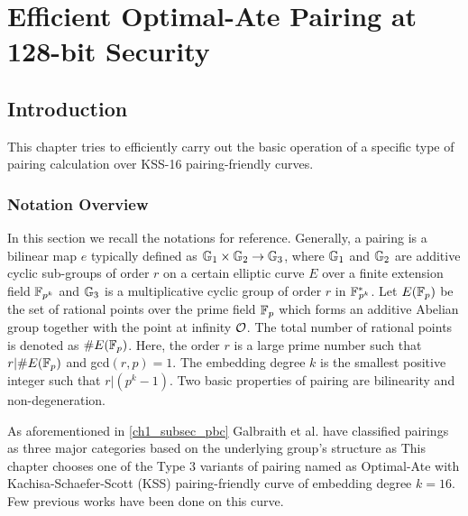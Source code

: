 \chapter{Efficient Optimal-Ate Pairing at 128-bit Security} 
\label{ch:indocrypt}
\section{Introduction}
This chapter tries to efficiently carry out the basic operation of a specific type of pairing calculation over KSS-16 pairing-friendly curves. 

\subsection{Notation Overview}
In this section we recall the notations for reference.
Generally, a pairing is a bilinear map $e$ typically defined as  ${\mathbb{G}}_{1} \times {\mathbb{G}}_{2} \to {\mathbb{G}}_{3}$, where ${\mathbb{G}}_{1}$ and ${\mathbb{G}}_{2}$ are additive cyclic sub-groups of  order $r$  on a certain elliptic curve $E$ over a finite extension field $\mathbb{F}_{p^k}$ and ${\mathbb{G}}_{3}$ is a multiplicative cyclic group of order $r$ in ${{\mathbb{F}}^{\ast}}_{\!\!\!p^{k}}$.
Let $E({\mathbb{F}}_{p})$ be the set of rational points over the prime field ${\mathbb{F}}_{p}$ which forms an additive Abelian group together with the point at infinity $\cal{O}$. The total number of rational points is denoted as $\#E({\mathbb{F}}_{p})$. Here, the order $r$ is a large prime number such that $r | \#E({\mathbb{F}}_{p})$ and gcd$(r,p)=1$. The embedding degree $k$ is the smallest positive integer such that $r | (p^k -1)$.
 Two basic properties of pairing are bilinearity and non-degeneration.


As aforementioned in \ref{ch1_subsec_pbc} Galbraith et al. \cite{galbraith2008pairings} have classified pairings as three major categories based on the underlying group's structure as 
This chapter chooses one of the Type 3 variants of pairing named as Optimal-Ate \cite{DBLP:journals/tit/Vercauteren10} with Kachisa-Schaefer-Scott (KSS) \cite{EPRINT:KacSchSco07} pairing-friendly curve of embedding degree $k=16$. 
Few previous works have been done on this  curve. 


